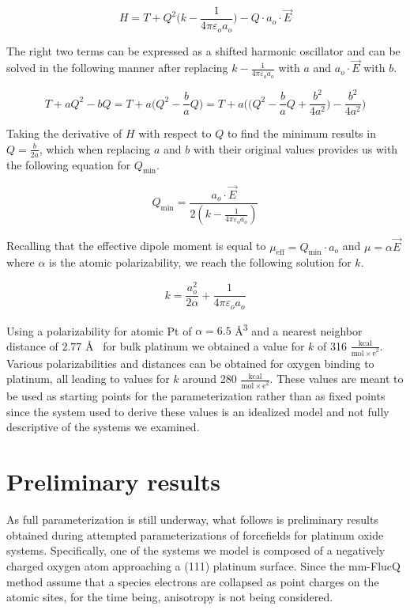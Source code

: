 \begin{equation*}
H = T + Q^2\bigg(k - \frac{1}{4 \pi\varepsilon_o a_o}\bigg) - Q\cdot a_o \cdot \vec{E}
\end{equation*}

The right two terms can be expressed as a shifted harmonic oscillator and can be solved in the
following manner after replacing $k-\frac{1}{4\pi\varepsilon_o a_o}$ with $a$
and $a_o\cdot \vec{E}$ with $b$.

\begin{equation*}
T + aQ^2 - bQ  = T + a\bigg(Q^2 - \frac{b}{a}Q\bigg) = T + a\bigg(\bigg(Q^2 - \frac{b}{a}Q + \frac{b^2}{4a^2}\bigg) - \frac{b^2}{4a^2}\bigg)
\end{equation*}

Taking the derivative of $H$ with respect to $Q$ to find the minimum results in $Q = \frac{b}{2a}$,
which when replacing $a$ and $b$ with their original values provides us with
the following equation for $Q_{\text{min}}$.

\begin{equation*}
Q_{\text{min}} = \frac{a_o \cdot \vec{E}}{2(k - \frac{1}{4\pi\varepsilon_o a_o})}
\end{equation*}

Recalling that the effective dipole moment is equal to $\mu_{\text{eff}} =
Q_{\text{min}}\cdot a_o$ and $\mu = \alpha\vec{E}$ where $\alpha$ is the atomic
polarizability, we reach the following solution for $k$.

\begin{equation*}
k = \frac{a_o^2}{2\alpha} + \frac{1}{4\pi\varepsilon_o a_o}
\end{equation*}

Using a polarizability for atomic Pt of $\alpha = 6.5$ \AA\textsuperscript{3}
and a nearest neighbor distance of $2.77$ \AA~ for bulk platinum we obtained a
value for $k$ of 316 $\frac{\text{kcal}}{\mathrm{mol\times e}^2}$. Various
polarizabilities and distances can be obtained for oxygen binding to platinum,
all leading to values for $k$ around 280 $\frac{\text{kcal}}{\mathrm{mol\times
e}^2}$.  These values are meant to be used as starting points for the
parameterization rather than as fixed points since the system used to derive
these values is an idealized model and not fully descriptive of the systems we
examined.

\section{Preliminary results}
As full parameterization is still underway, what follows is preliminary results
obtained during attempted parameterizations of forcefields for platinum oxide
systems. Specifically, one of the systems we model is composed of a negatively
charged oxygen atom approaching a (111) platinum surface. 
Since the mm-FlucQ method assume that a species electrons are collapsed
as point charges on the atomic sites, for the time being, anisotropy is not being considered. 

